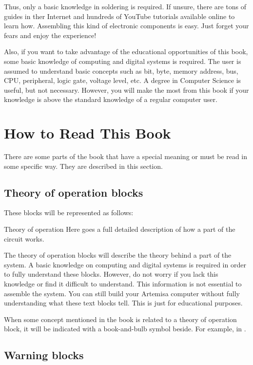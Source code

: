 Thus, only a basic knowledge in soldering is required. If unsure, there are tons of guides in ther Internet and hundreds of YouTube tutorials available online to learn how. Assembling this kind of electronic components is easy. Just forget your fears and enjoy the experience!

Also, if you want to take advantage of the educational opportunities of this book, some basic knowledge of computing and digital systems is required. The user is assumed to understand basic concepts such as bit, byte, memory address, bus, CPU, peripheral, logic gate, voltage level, etc. A degree in Computer Science is useful, but not necessary. However, you will make the most from this book if your knowledge is above the standard knowledge of a regular computer user.

\section{How to Read This Book}

There are some parts of the book that have a special meaning or must be read in some specific way. They are described in this section. 

\subsection{Theory of operation blocks}

These blocks will be represented as follows:

\begin{theory}[h!]{Theory of operation}
	Here goes a full detailed description of how a part of the circuit works. 	
\end{theory}

The theory of operation blocks will describe the theory behind a part of the system. A basic knowledge on computing and digital systems is required in order to fully understand these blocks. However, do not worry if you lack this knowledge or find it difficult to understand. This information is not essential to assemble the system. You can still build your Artemisa computer without fully understanding what these text blocks tell. This is just for educational purposes.

When some concept mentioned in the book is related to a theory of operation block, it will be indicated with a book-and-bulb symbol beside. For example, in .

\subsection{Warning blocks}

